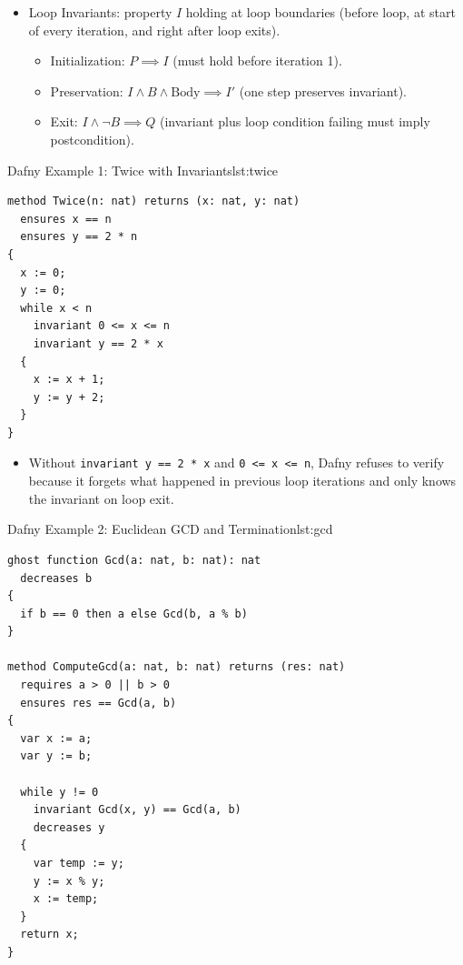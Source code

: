 \documentclass[11pt]{book}
\begin{document}
\begin{itemize}
    \item Loop Invariants: property $I$ holding at loop boundaries (before loop, at start of every iteration, and right after loop exits).
    \begin{itemize}
        \item Initialization: $P \implies I$ (must hold before iteration 1).
        \item Preservation: $I \land B \land \text{Body} \implies I'$ (one step preserves invariant).
        \item Exit: $I \land \neg B \implies Q$ (invariant plus loop condition failing must imply postcondition).
    \end{itemize}
\end{itemize}

\begin{ppprogram}{Dafny Example 1: Twice with Invariants}{lst:twice}
\begin{lstlisting}
method Twice(n: nat) returns (x: nat, y: nat)
  ensures x == n
  ensures y == 2 * n
{
  x := 0;
  y := 0;
  while x < n
    invariant 0 <= x <= n
    invariant y == 2 * x
  {
    x := x + 1;
    y := y + 2;
  }
}
\end{lstlisting}
\end{ppprogram}

\begin{itemize}
    \item Without \texttt{invariant y == 2 * x} and \texttt{0 <= x <= n}, Dafny refuses to verify because it forgets what happened in previous loop iterations and only knows the invariant on loop exit.
\end{itemize}

\begin{ppprogram}{Dafny Example 2: Euclidean GCD and Termination}{lst:gcd}
\begin{lstlisting}
ghost function Gcd(a: nat, b: nat): nat
  decreases b
{
  if b == 0 then a else Gcd(b, a % b)
}

method ComputeGcd(a: nat, b: nat) returns (res: nat)
  requires a > 0 || b > 0
  ensures res == Gcd(a, b)
{
  var x := a;
  var y := b;

  while y != 0
    invariant Gcd(x, y) == Gcd(a, b)
    decreases y
  {
    var temp := y;
    y := x % y;
    x := temp;
  }
  return x;
}
\end{lstlisting}
\end{ppprogram}
\end{document}
